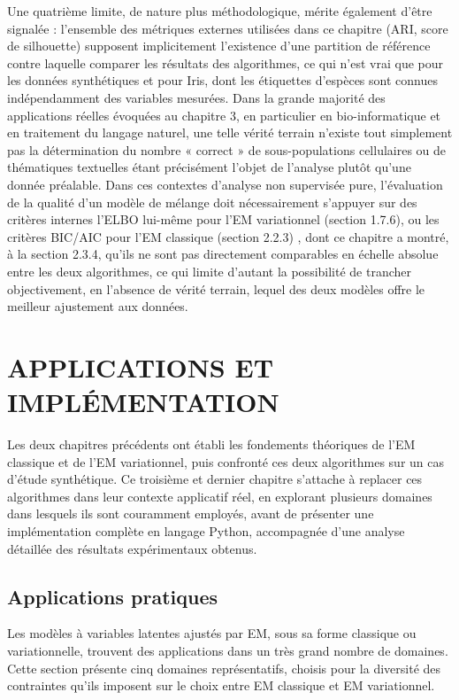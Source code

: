 Une quatrième limite, de nature plus méthodologique, mérite également d'être signalée : l'ensemble des métriques externes utilisées dans ce chapitre (ARI, score de silhouette) supposent implicitement l'existence d'une partition de référence contre laquelle comparer les résultats des algorithmes, ce qui n'est vrai que pour les données synthétiques et pour Iris, dont les étiquettes d'espèces sont connues indépendamment des variables mesurées. Dans la grande majorité des applications réelles évoquées au chapitre 3, en particulier en bio-informatique et en traitement du langage naturel, une telle vérité terrain n'existe tout simplement pas  la détermination du nombre « correct » de sous-populations cellulaires ou de thématiques textuelles étant précisément l'objet de l'analyse plutôt qu'une donnée préalable. Dans ces contextes d'analyse non supervisée pure, l'évaluation de la qualité d'un modèle de mélange doit nécessairement s'appuyer sur des critères internes  l'ELBO lui-même pour l'EM variationnel (section 1.7.6), ou les critères BIC/AIC pour l'EM classique (section 2.2.3) , dont ce chapitre a montré, à la section 2.3.4, qu'ils ne sont pas directement comparables en échelle absolue entre les deux algorithmes, ce qui limite d'autant la possibilité de trancher objectivement, en l'absence de vérité terrain, lequel des deux modèles offre le meilleur ajustement aux données.


\chapter{APPLICATIONS ET IMPLÉMENTATION}
Les deux chapitres précédents ont établi les fondements théoriques de l'EM classique et de l'EM variationnel, puis confronté ces deux algorithmes sur un cas d'étude synthétique. Ce troisième et dernier chapitre s'attache à replacer ces algorithmes dans leur contexte applicatif réel, en explorant plusieurs domaines dans lesquels ils sont couramment employés, avant de présenter une implémentation complète en langage Python, accompagnée d'une analyse détaillée des résultats expérimentaux obtenus.

\section{Applications pratiques}
Les modèles à variables latentes ajustés par EM, sous sa forme classique ou variationnelle, trouvent des applications dans un très grand nombre de domaines. Cette section présente cinq domaines représentatifs, choisis pour la diversité des contraintes qu'ils imposent sur le choix entre EM classique et EM variationnel.

